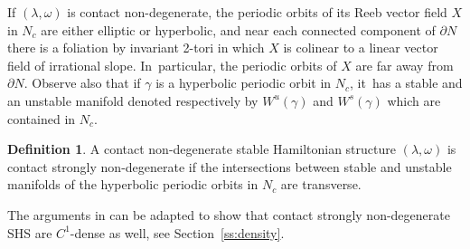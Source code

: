 \documentclass[10pt]{amsart}
\theoremstyle{definition}
\newtheorem{defi}[theorem]{Definition}
\begin{document}
If $(\lambda,\omega)$ is contact non-degenerate, the periodic orbits of its Reeb vector field $X$ in $N_c$ are either elliptic or hyperbolic, and near each connected component of $\partial N$ there is a foliation by invariant 2-tori in which $X$ is colinear to a linear vector field of irrational slope. In~particular, the periodic orbits of $X$ are far away from $\partial N$. Observe also that if $\gamma$ is a hyperbolic periodic orbit in $N_c$, it~has a stable and an unstable manifold denoted respectively by $W^u(\gamma)$ and $W^s(\gamma)$ which are contained in $N_c$.

\begin{defi}
A contact non-degenerate stable Hamiltonian structure $(\lambda,\omega)$ is contact strongly non-degenerate if the intersections between stable and unstable manifolds of the hyperbolic periodic orbits in $N_c$ are transverse.
\end{defi}

The arguments in \cite{CV1} can be adapted to show that contact strongly non-degenerate SHS are $C^1$-dense as well, see Section~\ref{ss:density}.
\end{document}
